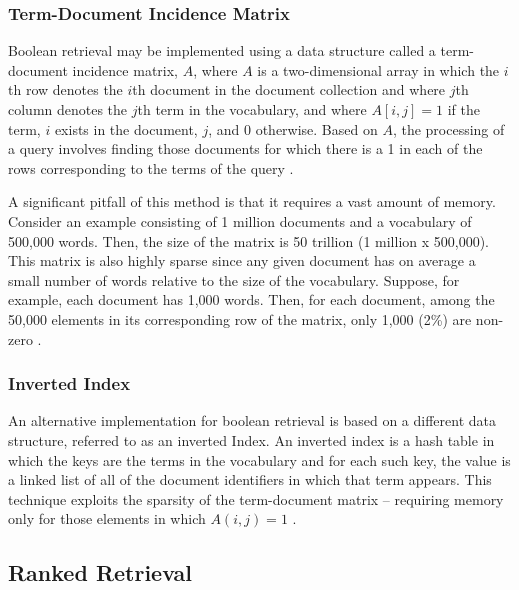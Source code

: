 %
%

\subsubsection{Term-Document Incidence Matrix}

Boolean retrieval may be  implemented using a data structure called a term-document incidence matrix, $A$, where $A$ is a two-dimensional array in which the $i$th row denotes the $i$th document in the document collection and where $j$th column denotes the $j$th term in the vocabulary, and where $A[i,j] = 1$ if the term, $i$ exists in the document, $j$, and 0 otherwise.  Based on $A$, the processing of a query involves finding those documents for which there is a 1 in each of the rows corresponding to the terms of the query \cite{manning_2008_introduction_ch1}.  

A significant pitfall of this method is that it requires a vast amount of memory.  Consider an example consisting of 1 million documents and a vocabulary of 500,000 words.  Then, the size of the matrix is 50 trillion (1 million x 500,000).  This matrix is also highly sparse since any given document has on average a small number of words relative to the size of the vocabulary.  Suppose, for example, each document has 1,000 words.  Then, for each document, among the 50,000 elements in its corresponding row of the matrix, only 1,000 (2\%) are non-zero \cite{manning_2008_introduction_ch1}.	

\subsubsection{Inverted Index}

An alternative implementation for boolean retrieval is based on a different data structure, referred to as an inverted Index.  An inverted index is a hash table in which the keys are the terms in the vocabulary and for each such key, the value is a linked list of all of the document identifiers in which that term appears.  This technique exploits the sparsity of the term-document matrix – requiring memory only for those elements in which $A(i,j) = 1$ \cite{manning_2008_introduction_ch1}.


\subsection{Ranked Retrieval}

